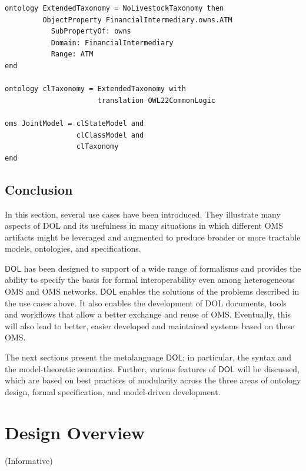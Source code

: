 \documentclass[10pt,fleqn,final]{scrreprt}
\newcommand{\cbs}[0]{\color{red}\xspace} %
\newcommand{\cbe}[0]{\color{black}\xspace} %
\newcommand*{\DOL}{\ensuremath{\mathsf{DOL}}\xspace}
\newcommand{\informative}[0]{{\begin{center}{\Large{(Informative})}\end{center}} \bigskip}
\newcommand{\clauseI}[1]{\chapter{#1} \informative }
\newenvironment{definitions}[0]{\medskip }{}
\begin{document}
\begin{definitions}
\begin{lstlisting}
ontology ExtendedTaxonomy = NoLivestockTaxonomy then 
         ObjectProperty FinancialIntermediary.owns.ATM
           SubPropertyOf: owns 
           Domain: FinancialIntermediary 
           Range: ATM
end

ontology clTaxonomy = ExtendedTaxonomy with 
                      translation OWL22CommonLogic

oms JointModel = clStateModel and 
                 clClassModel and 
                 clTaxonomy
end
\end{lstlisting}


\section{Conclusion}
\cbs
In this section, several use cases have been introduced. They illustrate many aspects of DOL and its usefulness in many situations in which different OMS artifacts might be leveraged and augmented to produce broader or more tractable models, ontologies, and specifications.

 \DOL has been designed to support of a wide range of formalisms and
provides the ability to specify the basis for formal interoperability even among heterogeneous OMS and OMS networks. \DOL enables the solutions of the problems described in the use cases above. It also enables the development of DOL documents, tools and workflows that 
allow  a better exchange and reuse of OMS. Eventually, this will also lead to better, easier developed and maintained systems based on these OMS.

The next sections present the metalanguage \DOL{}; in particular, the syntax and the model-theoretic semantics. Further, various features of \DOL will be discussed, which  are based on  best practices of modularity  across
 the three areas of ontology design, formal 
specification, and model-driven development.
\cbe



\clauseI{Design Overview} \label{c:design}


\end{definitions}
\end{document}
